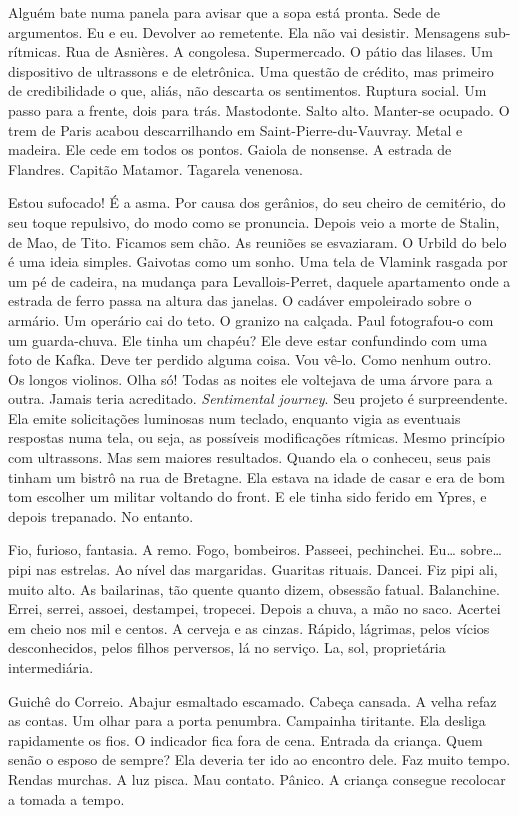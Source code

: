 Alguém bate numa panela para avisar que a sopa está pronta. Sede de
argumentos. Eu e eu. Devolver ao remetente. Ela não vai desistir.
Mensagens sub-rítmicas. Rua de Asnières. A congolesa. Supermercado. O
pátio das lilases. Um dispositivo de ultrassons e de eletrônica. Uma
questão de crédito, mas primeiro de credibilidade o que, aliás, não
descarta os sentimentos. Ruptura social. Um passo para a frente, dois
para trás. Mastodonte. Salto alto. Manter-se ocupado. O trem de Paris
acabou descarrilhando em Saint-Pierre-du-Vauvray. Metal e madeira. Ele
cede em todos os pontos. Gaiola de nonsense. A estrada de Flandres.
Capitão Matamor. Tagarela venenosa.

Estou sufocado! É a asma. Por causa dos gerânios, do seu cheiro de
cemitério, do seu toque repulsivo, do modo como se pronuncia. Depois
veio a morte de Stalin, de Mao, de Tito. Ficamos sem chão. As reuniões
se esvaziaram. O Urbild do belo é uma ideia simples. Gaivotas como um
sonho. Uma tela de Vlamink rasgada por um pé de cadeira, na mudança para
Levallois-Perret, daquele apartamento onde a estrada de ferro passa na
altura das janelas. O cadáver empoleirado sobre o armário. Um operário
cai do teto. O granizo na calçada. Paul fotografou-o com um
guarda-chuva. Ele tinha um chapéu? Ele deve estar confundindo com uma
foto de Kafka. Deve ter perdido alguma coisa. Vou vê-lo. Como nenhum
outro. Os longos violinos. Olha só! Todas as noites ele voltejava de uma
árvore para a outra. Jamais teria acreditado. \emph{Sentimental
journey}. Seu projeto é surpreendente. Ela emite solicitações luminosas
num teclado, enquanto vigia as eventuais respostas numa tela, ou seja,
as possíveis modificações rítmicas. Mesmo princípio com ultrassons. Mas
sem maiores resultados. Quando ela o conheceu, seus pais tinham um
bistrô na rua de Bretagne. Ela estava na idade de casar e era de bom tom
escolher um militar voltando do front. E ele tinha sido ferido em Ypres,
e depois trepanado. No entanto.

Fio, furioso, fantasia. A remo. Fogo, bombeiros. Passeei, pechinchei.
Eu\ldots{} sobre\ldots{} pipi nas estrelas. Ao nível das margaridas. Guaritas
rituais. Dancei. Fiz pipi ali, muito alto. As bailarinas, tão quente
quanto dizem, obsessão fatual. Balanchine. Errei, serrei, assoei,
destampei, tropecei. Depois a chuva, a mão no saco. Acertei em cheio nos
mil e centos. A cerveja e as cinzas. Rápido, lágrimas, pelos vícios
desconhecidos, pelos filhos perversos, lá no serviço. La, sol,
proprietária intermediária.

Guichê do Correio. Abajur esmaltado escamado. Cabeça cansada. A velha
refaz as contas. Um olhar para a porta penumbra. Campainha tiritante.
Ela desliga rapidamente os fios. O indicador fica fora de cena. Entrada
da criança. Quem senão o esposo de sempre? Ela deveria ter ido ao
encontro dele. Faz muito tempo. Rendas murchas. A luz pisca. Mau
contato. Pânico. A criança consegue recolocar a tomada a tempo.

